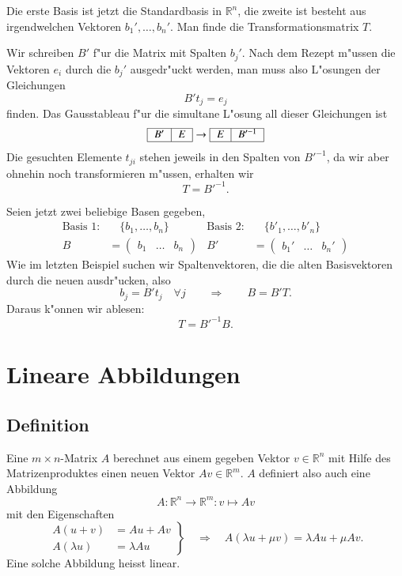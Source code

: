 \begin{beispiel}
Die erste Basis ist jetzt die Standardbasis in $\mathbb R^n$, die
zweite ist besteht aus irgendwelchen Vektoren $b_1',\dots,b_n'$.
Man finde die Transformationsmatrix $T$.

Wir schreiben $B'$ f"ur die Matrix mit Spalten $b_j'$. Nach dem
Rezept m"ussen die Vektoren $e_i$ durch die $b_j'$ ausgedr"uckt
werden, man muss also L"osungen der Gleichungen
\[
B't_j=e_j
\]
finden. Das Gausstableau f"ur die simultane L"osung all dieser
Gleichungen ist
\[
\begin{tabular}{|>{$}c<{$}|>{$}c<{$}|}
\hline
B'&E\\
\hline
\end{tabular}
\rightarrow
\begin{tabular}{|>{$}c<{$}|>{$}c<{$}|}
\hline
E&B'^{-1}\\
\hline
\end{tabular}
\]
Die gesuchten Elemente $t_{ji}$ stehen jeweils in den Spalten
von $B'^{-1}$, da wir aber ohnehin noch transformieren m"ussen,
erhalten wir
\[
T=B'^{-1}.
\]
\end{beispiel}

\begin{beispiel}
Seien jetzt zwei beliebige Basen gegeben, 
\begin{align*}
\text{Basis 1:}&\quad \{b_1,\dots,b_n\}
&
\text{Basis 2:}&\quad \{b'_1,\dots,b'_n\}
\\
B&=\begin{pmatrix}
b_1&\dots&b_n
\end{pmatrix}
&
B'&=\begin{pmatrix}
b_1'&\dots&b_n'
\end{pmatrix}
\end{align*}
Wie im letzten Beispiel suchen wir Spaltenvektoren, die die alten
Basisvektoren durch die neuen ausdr"ucken, also
\[
b_j=B't_j\quad\forall j\qquad\Rightarrow\qquad B=B'T.
\]
Daraus k"onnen wir ablesen:
\[
T=B'^{-1}B.
\]
\end{beispiel}

\section{Lineare Abbildungen}
\subsection{Definition}
Eine $m\times n$-Matrix $A$ berechnet aus einem gegeben Vektor
$v\in\mathbb R^n$ mit Hilfe des
Matrizenproduktes einen neuen Vektor $Av\in\mathbb R^m$. $A$ definiert also
auch eine Abbildung
\[
A\colon\mathbb R^n\to\mathbb R^m:v\mapsto Av
\]
mit den Eigenschaften
\[
\left.
\begin{aligned}
A(u+v)&=Au+Av\\
A(\lambda u)&=\lambda Au
\end{aligned}\right\}\quad
\Rightarrow\quad
A(\lambda u+\mu v)=\lambda Au+\mu Av.
\]
Eine solche Abbildung heisst linear.


